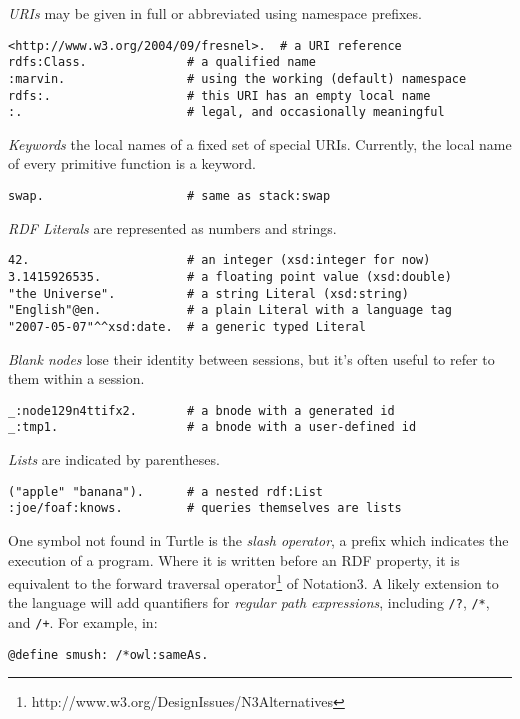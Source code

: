 \documentclass[runningheads]{llncs}
\begin{document}
\textit{URIs} may be given in full or abbreviated using namespace prefixes.
\begin{verbatim}
<http://www.w3.org/2004/09/fresnel>.  # a URI reference
rdfs:Class.              # a qualified name
:marvin.                 # using the working (default) namespace
rdfs:.                   # this URI has an empty local name
:.                       # legal, and occasionally meaningful
\end{verbatim}

\textit{Keywords} the local names of a fixed set of special URIs.  Currently, the local name of every primitive function is a keyword.
\begin{verbatim}
swap.                    # same as stack:swap
\end{verbatim}

\textit{RDF Literals} are represented as numbers and strings.
\begin{verbatim}
42.                      # an integer (xsd:integer for now)
3.1415926535.            # a floating point value (xsd:double)
"the Universe".          # a string Literal (xsd:string)
"English"@en.            # a plain Literal with a language tag
"2007-05-07"^^xsd:date.  # a generic typed Literal
\end{verbatim}

\textit{Blank nodes} lose their identity between sessions, but it's often useful to refer to them within a session.
\begin{verbatim}
_:node129n4ttifx2.       # a bnode with a generated id
_:tmp1.                  # a bnode with a user-defined id
\end{verbatim}

\textit{Lists} are indicated by parentheses.
\begin{verbatim}
("apple" "banana").      # a nested rdf:List
:joe/foaf:knows.         # queries themselves are lists
\end{verbatim}

One symbol not found in Turtle is the \textit{slash operator}, a prefix which indicates the execution of a program.  Where it is written before an RDF property, it is equivalent to the forward traversal operator\footnote{http://www.w3.org/DesignIssues/N3Alternatives} of Notation3.  A likely extension to the language will add quantifiers for \textit{regular path expressions}, including \texttt{/?}, \texttt{/*}, and \texttt{/+}.  For example, in:
\begin{verbatim}
@define smush: /*owl:sameAs.
\end{verbatim}
\end{document}
